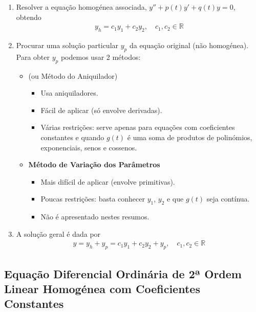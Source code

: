 \documentclass{article}
\begin{document}
\begin{enumerate}
    \item Resolver a equação homogénea associada, $y'' + p(t)y' + q(t)y = 0$, obtendo
    \begin{gather*}
    y_h = c_1 y_1 + c_2 y_2, \quad c_1, c_2 \in \mathbb{R}
    \end{gather*}

    \item Procurar uma solução particular $y_p$ da equação original (não homogénea).
    Para obter $y_p$ podemos usar 2 métodos:
    \begin{itemize}
        \item \textbf{} (ou Método do Aniquilador)
        \begin{itemize}
            \item Usa aniquiladores.
            \item Fácil de aplicar (só envolve derivadas).
            \item Várias restrições: serve apenas para equações com coeficientes constantes e quando $g(t)$
            é uma soma de produtos de polinómios, exponenciais, senos e cossenos.
        \end{itemize}
        \item \textbf{Método de Variação dos Parâmetros}
        \begin{itemize}
            \item Mais difícil de aplicar (envolve primitivas).
            \item Poucas restrições: basta conhecer $y_1$, $y_2$ e que $g(t)$ seja contínua.
            \item Não é apresentado nestes resumos.
        \end{itemize}
    \end{itemize}

    \item A solução geral é dada por
    \begin{gather*}
    \boxed{y = y_h + y_p = c_1 y_1 + c_2 y_2 + y_p, \quad c_1, c_2 \in \mathbb{R}}
    \end{gather*}
\end{enumerate}

\bigskip

\subsection{Equação Diferencial Ordinária de 2ª Ordem Linear Homogénea com Coeficientes Constantes}
\label{subsec: edo-ordem2-linear-homogenea-coef-constantes}
\end{document}
